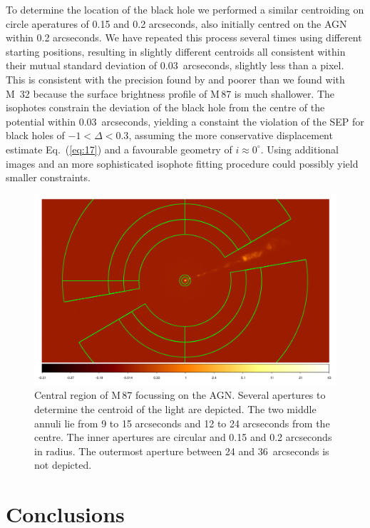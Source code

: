 \documentclass[useAMS,usenatbib]{mn2e}
\begin{document}
To determine the location of the black hole we performed a similar
centroiding on circle aperatures of 0.15 and 0.2 arcseconds, also
initially centred on the AGN within 0.2 arcseconds.  We have repeated
this process several times using different starting positions,
resulting in slightly different centroids all consistent within their
mutual standard deviation of 0.03~arcseconds, slightly less than a
pixel.  This is consistent with the precision found by
\cite{2013ApJ...770...86W} and poorer than we found with M~32 because
the surface brightness profile of M\,87 is much shallower.  The
isophotes constrain the deviation of the black hole from the centre of
the potential within 0.03~arcseconds, yielding a constaint the
violation of the SEP for black holes of $-1<\Delta<0.3$, assuming the
more conservative displacement estimate Eq.~(\ref{eq:17}) and a
favourable geometry of $i\approx 0^\circ$.  Using additional
images and an more sophisticated isophote fitting procedure could
possibly yield smaller constraints.
\begin{figure}
  \includegraphics[width=\columnwidth]{ds9.pdf}
  \caption{Central region of M\,87 focussing on the AGN.  Several
    apertures to determine the centroid of the light are depicted.
    The two middle annuli lie from 9 to 15 arcseconds and 12 to 24
    arcseconds from the centre.  The inner apertures are circular and
    0.15 and 0.2 arcseconds in radius. The outermost aperture between
    24 and 36~arcseconds is not depicted.}
  \label{fig:M87}
\end{figure}

\section{Conclusions}
\end{document}
